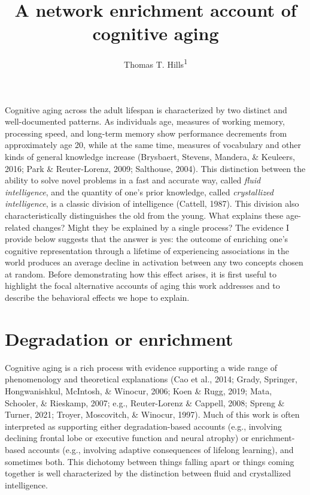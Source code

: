 \documentclass[
  man,floatsintext]{apa6}
\title{A network enrichment account of cognitive aging}
\author{Thomas T. Hills\textsuperscript{1}}
\date{}
\affiliation{\vspace{0.5cm}\textsuperscript{1} University of Warwick}
\begin{document}
\maketitle

Cognitive aging across the adult lifespan is characterized by two distinct and well-documented patterns. As individuals age, measures of working memory, processing speed, and long-term memory show performance decrements from approximately age 20, while at the same time, measures of vocabulary and other kinds of general knowledge increase (Brysbaert, Stevens, Mandera, \& Keuleers, 2016; Park \& Reuter-Lorenz, 2009; Salthouse, 2004). This distinction between the ability to solve novel problems in a fast and accurate way, called \emph{fluid intelligence}, and the quantity of one's prior knowledge, called \emph{crystallized intelligence}, is a classic division of intelligence (Cattell, 1987). This division also characteristically distinguishes the old from the young. What explains these age-related changes? Might they be explained by a single process? The evidence I provide below suggests that the answer is yes: the outcome of enriching one's cognitive representation through a lifetime of experiencing associations in the world produces an average decline in activation between any two concepts chosen at random. Before demonstrating how this effect arises, it is first useful to highlight the focal alternative accounts of aging this work addresses and to describe the behavioral effects we hope to explain.

\hypertarget{degradation-or-enrichment}{%
\section{Degradation or enrichment}\label{degradation-or-enrichment}}

Cognitive aging is a rich process with evidence supporting a wide range of phenomenology and theoretical explanations (Cao et al., 2014; Grady, Springer, Hongwanishkul, McIntosh, \& Winocur, 2006; Koen \& Rugg, 2019; Mata, Schooler, \& Rieskamp, 2007; e.g., Reuter-Lorenz \& Cappell, 2008; Spreng \& Turner, 2021; Troyer, Moscovitch, \& Winocur, 1997). Much of this work is often interpreted as supporting either degradation-based accounts (e.g., involving declining frontal lobe or executive function and neural atrophy) or enrichment-based accounts (e.g., involving adaptive consequences of lifelong learning), and sometimes both. This dichotomy between things falling apart or things coming together is well characterized by the distinction between fluid and crystallized intelligence.
\end{document}

